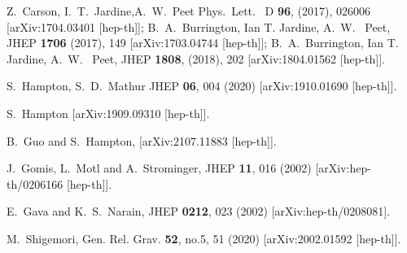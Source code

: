 \documentclass[11pt]{article}
\begin{document}
\begin{thebibliography}{99}
Z.~Carson, I.~T.~Jardine,A.~W.~Peet
 Phys.\ Lett. \ D {\bf 96}, (2017), 026006
 [arXiv:1704.03401 [hep-th]];
   B.~A.~Burrington, Ian T. Jardine, A.~W.~ Peet,
JHEP {\bf 1706} (2017), 149 
[arXiv:1703.04744 [hep-th]];
  B.~A.~Burrington, Ian T. Jardine, A.~W.~ Peet,
  JHEP {\bf 1808}, (2018), 202
  [arXiv:1804.01562 [hep-th]].
  






  S.~Hampton, S.~D.~Mathur
  JHEP {\bf 06}, 004 (2020)
  [arXiv:1910.01690 [hep-th]].

  
S.~Hampton
 [arXiv:1909.09310 [hep-th]].
    

    
B.~Guo and S.~Hampton,
[arXiv:2107.11883 [hep-th]].
  
 

J.~Gomis, L.~Motl and A.~Strominger,
JHEP \textbf{11}, 016 (2002)
[arXiv:hep-th/0206166 [hep-th]].
 
  E.~Gava and K.~S.~Narain,
  JHEP {\bf 0212}, 023 (2002)
  [arXiv:hep-th/0208081].
  
M.~Shigemori,
Gen. Rel. Grav. \textbf{52}, no.5, 51 (2020)
[arXiv:2002.01592 [hep-th]].


\end{thebibliography}
\end{document}
